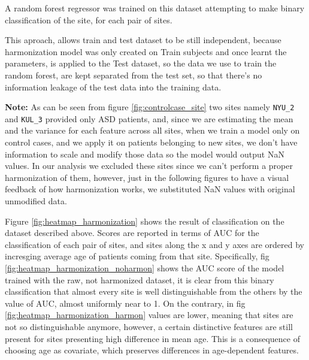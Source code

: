 \documentclass[12pt]{report}
\begin{document}
A random forest regressor was trained on this dataset attempting to make binary classification of the site, for each pair of sites.

This aproach, allows train and test dataset to be still independent, because harmonization model was only created on Train subjects and once learnt the parameters, is applied to the Test dataset, so the data we use to train the random forest, are kept separated from the test set, so that there's no information leakage of the test data into the training data.
\newline

\textbf{Note:} As can be seen from figure \ref{fig:controlcase_site} two sites namely \texttt{NYU\_2} and \texttt{KUL\_3} provided only ASD patients, and, since we are estimating the mean and the variance for each feature across all sites, when we train a model only on control cases, and we apply it on patients belonging to new sites, we don't have information to scale and modify those data so the model would output NaN values.
In our analysis we excluded these sites since we can't perform a proper harmonization of them, however, just in the following figures to have a visual feedback of how harmonization works, we substituted NaN values with original unmodified data.
\newline

Figure \ref{fig:heatmap_harmonization} shows the result of classification on the dataset described above. Scores are reported in terms of AUC for the classification of each pair of sites, and sites along the x and y axes are ordered by incresging average age of patients coming from that site.
Specifically, fig \ref{fig:heatmap_harmonization_noharmon} shows the AUC score of the model trained with the raw, not harmonized dataset, it is clear from this binary classification that almost every site is well distinguishable from the others by the value of AUC, almost uniformly near to 1.
On the contrary, in fig \ref{fig:heatmap_harmonization_harmon} values are lower, meaning that sites are not so distinguishable anymore, however, a certain distinctive features are still present for sites presenting high difference in mean age.
This is a consequence of choosing age as covariate, which preserves differences in age-dependent features.
\end{document}
